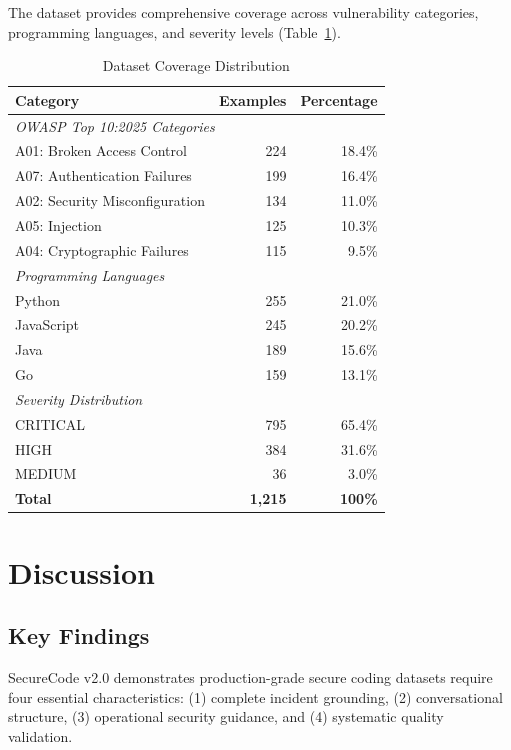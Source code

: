 \documentclass[11pt,letterpaper]{article}
\begin{document}
The dataset provides comprehensive coverage across vulnerability categories, programming languages, and severity levels (Table~\ref{tab:coverage}).

\begin{table}[h]
\centering
\caption{Dataset Coverage Distribution}
\label{tab:coverage}
\begin{tabular}{lrr}
\toprule
\textbf{Category} & \textbf{Examples} & \textbf{Percentage} \\
\midrule
\multicolumn{3}{l}{\textit{OWASP Top 10:2025 Categories}} \\
A01: Broken Access Control & 224 & 18.4\% \\
A07: Authentication Failures & 199 & 16.4\% \\
A02: Security Misconfiguration & 134 & 11.0\% \\
A05: Injection & 125 & 10.3\% \\
A04: Cryptographic Failures & 115 & 9.5\% \\
\midrule
\multicolumn{3}{l}{\textit{Programming Languages}} \\
Python & 255 & 21.0\% \\
JavaScript & 245 & 20.2\% \\
Java & 189 & 15.6\% \\
Go & 159 & 13.1\% \\
\midrule
\multicolumn{3}{l}{\textit{Severity Distribution}} \\
CRITICAL & 795 & 65.4\% \\
HIGH & 384 & 31.6\% \\
MEDIUM & 36 & 3.0\% \\
\midrule
\textbf{Total} & \textbf{1,215} & \textbf{100\%} \\
\bottomrule
\end{tabular}
\end{table}

\section{Discussion}

\subsection{Key Findings}

SecureCode v2.0 demonstrates production-grade secure coding datasets require four essential characteristics: (1) complete incident grounding, (2) conversational structure, (3) operational security guidance, and (4) systematic quality validation.
\end{document}
